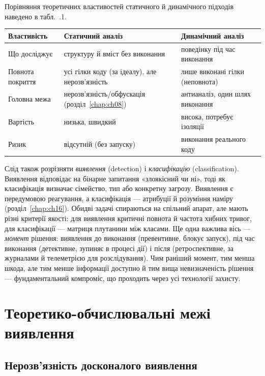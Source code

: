 Порівняння теоретичних властивостей статичного й динамічного підходів наведено в табл.~\thechapter.1.


\begin{center}\footnotesize
\begin{tabularx}{\linewidth}{L{22mm} Y Y}
\toprule
Властивість & Статичний аналіз & Динамічний аналіз \\
\midrule
Що досліджує & структуру й вміст без виконання & поведінку під час виконання \\
Повнота покриття & усі гілки коду (за ідеалу), але нерозв'язність & лише виконані гілки (неповнота) \\
Головна межа & нерозв'язність/обфускація (розділ~\ref{chap:ch08}) & антианаліз, один шлях виконання \\
Вартість & низька, швидкий & висока, потребує ізоляції \\
Ризик & відсутній (без запуску) & виконання реального коду \\
\bottomrule
\end{tabularx}
\end{center}

Слід також розрізняти \emph{виявлення} (detection) і \emph{класифікацію} (classification). Виявлення відповідає на бінарне запитання «злоякісний чи ні», тоді як класифікація визначає сімейство, тип або конкретну загрозу. Виявлення є передумовою реагування, а класифікація --- атрибуції й розуміння наміру (розділ~\ref{chap:ch16}). Обидві задачі спираються на спільний апарат, але мають різні критерії якості: для виявлення критичні повнота й частота хибних тривог, для класифікації --- матриця плутанини між класами. Ще одна важлива вісь --- \emph{момент} рішення: виявлення до виконання (превентивне, блокує запуск), під час виконання (детективне, зупиняє в процесі дії) і після (ретроспективне, за журналами й телеметрією для розслідування). Чим раніший момент, тим менша шкода, але тим менше інформації доступно й тим вища невизначеність рішення --- фундаментальний компроміс, що проходить через усі технології захисту.

\section{Теоретико-обчислювальні межі виявлення}\label{sec:ch03-limits}

\subsection{Нерозв'язність досконалого виявлення}

